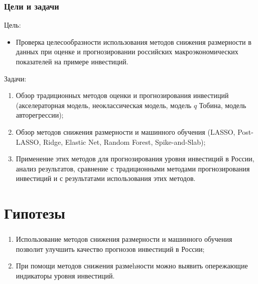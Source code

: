 \documentclass[c, dvipsnames]{beamer}  %
\begin{document}
\begin{frame}[shrink=3]
	\frametitle{Цели и задачи}
	\begin{block}{Цель:}
	\begin{itemize}
		\item Проверка целесообразности использования методов снижения размерности в данных при оценке и прогнозировании российских макроэкономических показателей на примере инвестиций.
	\end{itemize}
		
	\end{block}

	 	\begin{block}{Задачи:}
			\begin{enumerate}
			\item Обзор традиционных методов оценки и прогнозирования инвестиций (акселераторная модель, неоклассическая модель, модель $q$ Тобина, модель авторегрессии);
	\item Обзор методов снижения размерности и машинного обучения (LASSO, Post-LASSO, Ridge, Elastic Net, Random Forest, Spike-and-Slab);
    \item Применение этих методов для прогнозирования уровня инвестиций в России, анализ результатов, сравнение с традиционными методами прогнозирования инвестиций и с результатами использования этих методов.
	 \end{enumerate}	
	\end{block}
\end{frame}


\section{Гипотезы}
\begin{frame}[с, shrink=5]
\frametitle{\insertsection} 

\begin{enumerate}
	\item Использование методов снижения размерности и машинного обучения позволит улучшить качество прогнозов инвестиций в России;
	\item При помощи методов снижения размеhности можно выявить опережающие индикаторы уровня инвестиций.
	 \end{enumerate}

\begin{center}

\end{center}


\end{frame}
\end{document}
